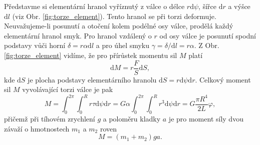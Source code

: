 \documentclass[english]{article}
\begin{document}
					Představme si elementární hranol vyříznutý z válce o délce $r \mathrm{d} \psi$, šířce $\mathrm{d}r$ a výšce $\mathrm{d}l$ (viz Obr. \ref{fig:torze_element}). Tento hranol se při torzi deformuje. Neuvažujeme-li posunutí a otočení kolem podélné osy válce, prodělá každý elementární hranol smyk. Pro hranol vzdálený o $r$ od osy válce je posunutí spodní podstavy vůči horní  $\delta = r \alpha \mathrm{d}l$ a pro úhel smyku $\gamma = \delta/\mathrm{d}l = r \alpha$. Z Obr. \ref{fig:torze_element} vidíme, že pro přírůstek momentu sil $M$ platí	
					\begin{equation}
					\mathrm{d}M = r \frac{F}{S} \mathrm{d}S,
					\end{equation}
					kde $\mathrm{d}S$ je plocha podstavy elementárního hranolu $\mathrm{d}S = r \mathrm{d}\psi \mathrm{d}r$. Celkový moment sil $M$ vyvolávající torzi válce je pak 
					\begin{equation}\label{eq:G_torze}
					M = \int_{0}^{2 \pi}\int_{0}^{R} r \tau \mathrm{d}\psi \mathrm{d}r = G \alpha \int_{0}^{2 \pi}\int_{0}^{R} r^3 \mathrm{d}\psi \mathrm{d}r = G \frac{\pi R^4}{2L}\varphi,
					\end{equation}
					přičemž při tíhovém zrychlení $g$ a poloměru kladky $a$ je pro moment síly dvou závaží o hmotnostech $m_1$ a $m_2$ roven 
					\begin{equation}\label{eq:G_torze2}
					M=(m_1+m_2)ga.
					\end{equation}			
						
\end{document}
